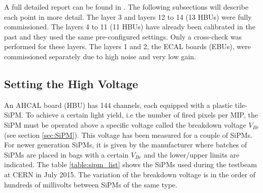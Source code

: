 A full detailed report can be found in \cite{Hartbrich2012}. The following subsections will describe each point in more detail. The layer 3 and layers 12 to 14 (13 HBUs) were fully commissioned. The layers 4 to 11 (11 HBUs) have already been calibrated in the past and they used the same pre-configured settings. Only a cross-check was performed for these layers. The layers 1 and 2, the ECAL boards (EBUs), were commissioned separately due to high noise and very low gain.

\subsection{Setting the High Voltage}

\begin{table}[htb!]
  \centering
  \caption{List of the different SiPMs used in the CALICE AHCAL in July 2015.}
  \label{table:sipm_list}
\end{table}

An AHCAL board (HBU) has 144 channels, each equipped with a plastic tile-SiPM. To achieve a certain light yield, i.e the number of fired pixels per MIP, the SiPM must be operated above a specific voltage called the breakdown voltage $V_{Br}$ (see section \ref{sec:SiPM}). This voltage has been measured for a couple of SiPMs. For newer generation SiPMs, it is given by the manufacturer where batches of SiPMs are placed in bags with a certain $V_{Br}$ and the lower/upper limits are indicated. The table \ref{table:sipm_list} shows the SiPMs used during the testbeam at CERN in July 2015. The variation of the breakdown voltage is in the order of hundreds of millivolts between SiPMs of the same type.

